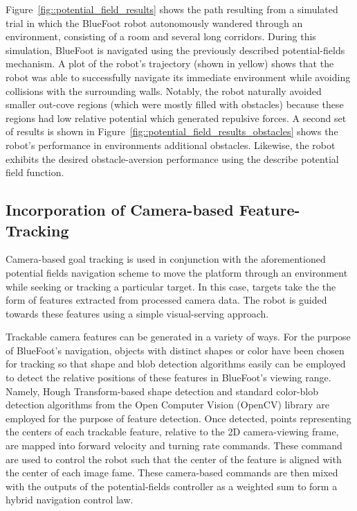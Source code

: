 			Figure~\ref{fig::potential_field_results} shows the path resulting from a simulated trial in which the BlueFoot robot autonomously wandered through an environment, consisting of a room and several long corridors. During this simulation, BlueFoot is navigated using the previously described potential-fields mechanism. A plot of the robot's trajectory (shown in yellow) shows that the robot was able to successfully navigate its immediate environment while avoiding collisions with the surrounding walls. Notably, the robot naturally avoided smaller out-cove regions (which were mostly filled with obstacles) because these regions had low relative potential which generated repulsive forces. A second set of results is shown in Figure~\ref{fig::potential_field_results_obstacles} shows the robot's performance in environments additional obstacles. Likewise, the robot exhibits the desired obstacle-aversion performance using the describe potential field function.


		\subsection{Incorporation of Camera-based Feature-Tracking}
		
			Camera-based goal tracking is used in conjunction with the aforementioned potential fields navigation scheme to move the platform through an environment while seeking or tracking a particular target. In this case, targets take the the form of features extracted from processed camera data. The robot is guided towards these features using a simple visual-serving approach. 

			Trackable camera features can be generated in a variety of ways. For the purpose of BlueFoot's navigation, objects with distinct shapes or color have been chosen for tracking so that shape and blob detection algorithms easily can be employed to detect the relative positions of these features in BlueFoot's viewing range. Namely, Hough Transform-based shape detection and standard color-blob detection algorithms from the Open Computer Vision (OpenCV) library are employed for the purpose of feature detection\cite{opencv_library}. Once detected, points representing the centers of each trackable feature, relative to the 2D camera-viewing frame, are mapped into forward velocity and turning rate commands. These command are used to control the robot such that the center of the feature is aligned with the center of each image fame. These camera-based commands are then mixed with the outputs of the potential-fields controller as a weighted sum to form a hybrid navigation control law.

